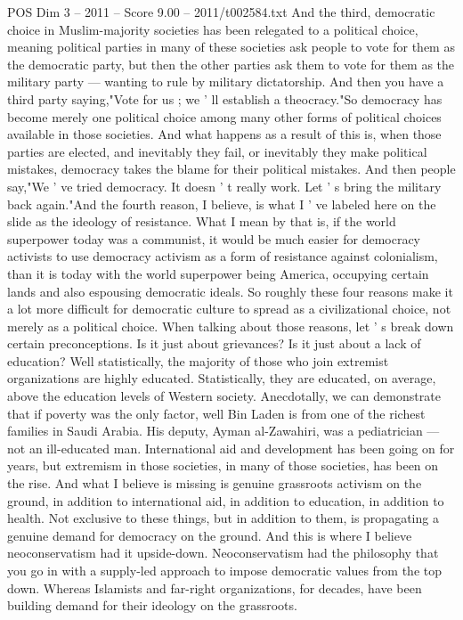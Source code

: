 \begin{textsample}{POS Dim 3 – 2011 – Score 9.00 – 2011/t002584.txt}
And the third, democratic choice in Muslim-majority societies has been relegated to a political choice, meaning political parties in many of these societies ask people to vote for them as the democratic party, but then the other parties ask them to vote for them as the military party — wanting to rule by military dictatorship.
And then you have a third party saying,"Vote for us ; we ' ll establish a theocracy."So democracy has become merely one political choice among many other forms of political choices available in those societies.
And what happens as a result of this is, when those parties are elected, and inevitably they fail, or inevitably they make political mistakes, democracy takes the blame for their political mistakes.
And then people say,"We ' ve tried democracy.
It doesn ' t really work.
Let ' s bring the military back again."And the fourth reason, I believe, is what I ' ve labeled here on the slide as the ideology of resistance.
What I mean by that is, if the world superpower today was a communist, it would be much easier for democracy activists to use democracy activism as a form of resistance against colonialism, than it is today with the world superpower being America, occupying certain lands and also espousing democratic ideals.
So roughly these four reasons make it a lot more difficult for democratic culture to spread as a civilizational choice, not merely as a political choice.
When talking about those reasons, let ' s break down certain preconceptions.
Is it just about grievances?
Is it just about a lack of education?
Well statistically, the majority of those who join extremist organizations are highly educated.
Statistically, they are educated, on average, above the education levels of Western society.
Anecdotally, we can demonstrate that if poverty was the only factor, well Bin Laden is from one of the richest families in Saudi Arabia.
His deputy, Ayman al-Zawahiri, was a pediatrician — not an ill-educated man.
International aid and development has been going on for years, but extremism in those societies, in many of those societies, has been on the rise.
And what I believe is missing is genuine grassroots activism on the ground, in addition to international aid, in addition to education, in addition to health.
Not exclusive to these things, but in addition to them, is propagating a genuine demand for democracy on the ground.
And this is where I believe neoconservatism had it upside-down.
Neoconservatism had the philosophy that you go in with a supply-led approach to impose democratic values from the top down.
Whereas Islamists and far-right organizations, for decades, have been building demand for their ideology on the grassroots.

\end{textsample}
